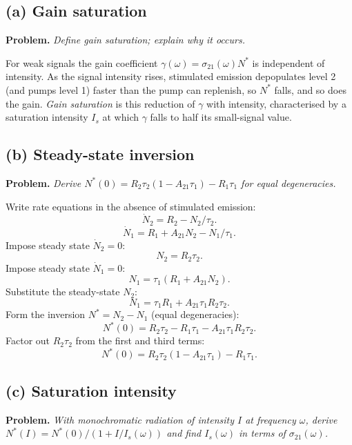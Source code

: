 \documentclass[11pt]{article}
\begin{document}
\subsection*{(a) Gain saturation}

\textbf{Problem.} \emph{Define gain saturation; explain why it occurs.}

For weak signals the gain coefficient $\gamma(\omega)=\sigma_{21}(\omega)N^{*}$ is independent of intensity. As the signal intensity rises, stimulated emission depopulates level 2 (and pumps level 1) faster than the pump can replenish, so $N^{*}$ falls, and so does the gain. \emph{Gain saturation} is this reduction of $\gamma$ with intensity, characterised by a saturation intensity $I_s$ at which $\gamma$ falls to half its small-signal value.

\subsection*{(b) Steady-state inversion}

\textbf{Problem.} \emph{Derive $N^{*}(0)=R_2\tau_2(1-A_{21}\tau_1)-R_1\tau_1$ for equal degeneracies.}

Write rate equations in the absence of stimulated emission:
\[
\dot N_2=R_2-N_2/\tau_2.
\]
\[
\dot N_1=R_1+A_{21}N_2-N_1/\tau_1.
\]
Impose steady state $\dot N_2=0$:
\[
N_2=R_2\tau_2.
\]
Impose steady state $\dot N_1=0$:
\[
N_1=\tau_1(R_1+A_{21}N_2).
\]
Substitute the steady-state $N_2$:
\[
N_1=\tau_1 R_1+A_{21}\tau_1 R_2\tau_2.
\]
Form the inversion $N^{*}=N_2-N_1$ (equal degeneracies):
\[
N^{*}(0)=R_2\tau_2-R_1\tau_1-A_{21}\tau_1 R_2\tau_2.
\]
Factor out $R_2\tau_2$ from the first and third terms:
\begin{equation}
\boxed{\;N^{*}(0)=R_2\tau_2(1-A_{21}\tau_1)-R_1\tau_1.\;}
\label{eq:Nstar0}
\end{equation}

\subsection*{(c) Saturation intensity}

\textbf{Problem.} \emph{With monochromatic radiation of intensity $I$ at frequency $\omega$, derive $N^{*}(I)=N^{*}(0)/(1+I/I_s(\omega))$ and find $I_s(\omega)$ in terms of $\sigma_{21}(\omega)$.}
\end{document}
